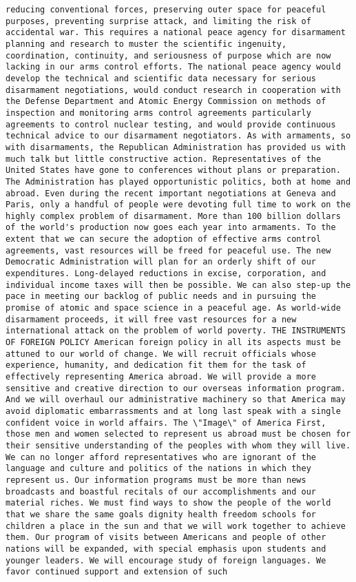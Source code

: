 \documentclass[
]{article}
\begin{document}
\begin{verbatim}
reducing conventional forces, preserving outer space for peaceful purposes, preventing surprise attack, and limiting the risk of accidental war. This requires a national peace agency for disarmament planning and research to muster the scientific ingenuity, coordination, continuity, and seriousness of purpose which are now lacking in our arms control efforts. The national peace agency would develop the technical and scientific data necessary for serious disarmament negotiations, would conduct research in cooperation with the Defense Department and Atomic Energy Commission on methods of inspection and monitoring arms control agreements particularly agreements to control nuclear testing, and would provide continuous technical advice to our disarmament negotiators. As with armaments, so with disarmaments, the Republican Administration has provided us with much talk but little constructive action. Representatives of the United States have gone to conferences without plans or preparation. The Administration has played opportunistic politics, both at home and abroad. Even during the recent important negotiations at Geneva and Paris, only a handful of people were devoting full time to work on the highly complex problem of disarmament. More than 100 billion dollars of the world's production now goes each year into armaments. To the extent that we can secure the adoption of effective arms control agreements, vast resources will be freed for peaceful use. The new Democratic Administration will plan for an orderly shift of our expenditures. Long-delayed reductions in excise, corporation, and individual income taxes will then be possible. We can also step-up the pace in meeting our backlog of public needs and in pursuing the promise of atomic and space science in a peaceful age. As world-wide disarmament proceeds, it will free vast resources for a new international attack on the problem of world poverty. THE INSTRUMENTS OF FOREIGN POLICY American foreign policy in all its aspects must be attuned to our world of change. We will recruit officials whose experience, humanity, and dedication fit them for the task of effectively representing America abroad. We will provide a more sensitive and creative direction to our overseas information program. And we will overhaul our administrative machinery so that America may avoid diplomatic embarrassments and at long last speak with a single confident voice in world affairs. The \"Image\" of America First, those men and women selected to represent us abroad must be chosen for their sensitive understanding of the peoples with whom they will live. We can no longer afford representatives who are ignorant of the language and culture and politics of the nations in which they represent us. Our information programs must be more than news broadcasts and boastful recitals of our accomplishments and our material riches. We must find ways to show the people of the world that we share the same goals dignity health freedom schools for children a place in the sun and that we will work together to achieve them. Our program of visits between Americans and people of other nations will be expanded, with special emphasis upon students and younger leaders. We will encourage study of foreign languages. We favor continued support and extension of such 
\end{verbatim}
\end{document}
